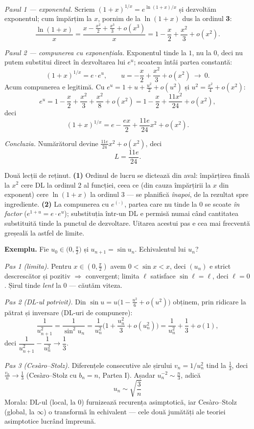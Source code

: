 \emph{Pasul 1 --- exponentul.} Scriem $(1+x)^{1/x}=e^{\ln(1+x)/x}$ și dezvoltăm exponentul; cum împărțim la $x$, pornim de la $\ln(1+x)$ dus la ordinul \textbf{3}:
\[
\frac{\ln(1+x)}{x}=\frac{x-\frac{x^2}{2}+\frac{x^3}{3}+o(x^3)}{x}
=1-\frac{x}{2}+\frac{x^2}{3}+o(x^2).
\]

\emph{Pasul 2 --- compunerea cu exponențiala.} Exponentul tinde la $1$, nu la $0$, deci nu putem substitui direct în dezvoltarea lui $e^u$; scoatem întâi partea constantă:
\[
(1+x)^{1/x}=e\cdot e^{u},
\qquad
u=-\frac{x}{2}+\frac{x^2}{3}+o(x^2)\ \to\ 0.
\]
Acum compunerea e legitimă. Cu $e^u=1+u+\frac{u^2}{2}+o(u^2)$ și $u^2=\frac{x^2}{4}+o(x^2)$:
\[
e^{u}=1-\frac{x}{2}+\frac{x^2}{3}+\frac{x^2}{8}+o(x^2)
=1-\frac{x}{2}+\frac{11x^2}{24}+o(x^2),
\]
deci
\[
(1+x)^{1/x}=e-\frac{ex}{2}+\frac{11e}{24}x^{2}+o(x^2).
\]

\emph{Concluzia.} Numărătorul devine $\frac{11e}{24}x^2+o(x^2)$, deci
\[
\boxed{\ L=\frac{11e}{24}.\ }
\]

Două lecții de reținut. \textbf{(1)} Ordinul de lucru se dictează din aval: împărțirea finală la $x^2$ cere DL la ordinul 2 al funcției, ceea ce (din cauza împărțirii la $x$ din exponent) cere $\ln(1+x)$ la ordinul 3 --- se planifică \emph{înapoi}, de la rezultat spre ingrediente. \textbf{(2)} La compunerea cu $e^{(\cdot)}$, partea care nu tinde la $0$ se scoate \emph{în factor} ($e^{1+u}=e\cdot e^u$); substituția într-un DL e permisă numai când cantitatea substituită tinde la punctul de dezvoltare. Uitarea acestui pas e cea mai frecventă greșeală la astfel de limite.

\medskip
\textbf{Exemplu.} Fie $u_0\in\big(0,\frac\pi2\big)$ și $u_{n+1}=\sin u_n$. Echivalentul lui $u_n$?

\emph{Pas 1 (limita).} Pentru $x\in(0,\frac\pi2)$ avem $0<\sin x<x$, deci $(u_n)$ e strict descrescător și pozitiv $\Rightarrow$ convergent; limita $\ell$ satisface $\sin\ell=\ell$, deci $\ell=0$. Șirul tinde \emph{lent} la $0$ --- căutăm viteza.

\emph{Pas 2 (DL-ul potrivit).} Din $\sin u=u\big(1-\frac{u^2}{6}+o(u^2)\big)$ obținem, prin ridicare la pătrat și inversare (DL-uri de compunere):
\[
\frac{1}{u_{n+1}^{2}}=\frac{1}{\sin^2u_n}=\frac{1}{u_n^2}\Big(1+\frac{u_n^2}{3}+o(u_n^2)\Big)
=\frac{1}{u_n^2}+\frac13+o(1),
\]
deci $\dfrac{1}{u_{n+1}^2}-\dfrac{1}{u_n^2}\to\dfrac13$.

\emph{Pas 3 (Cesàro--Stolz).} Diferențele consecutive ale șirului $v_n=1/u_n^2$ tind la $\frac13$, deci $\frac{v_n}{n}\to\frac13$ (Cesàro--Stolz cu $b_n=n$, Partea I). Așadar $u_n^{-2}\sim\frac n3$, adică
\[
\boxed{\;u_n\sim\sqrt{\frac{3}{n}}\;}
\]
Morala: DL-ul (local, la $0$) furnizează recurența asimptotică, iar Cesàro--Stolz (global, la $\infty$) o transformă în echivalent --- cele două jumătăți ale teoriei asimptotice lucrând împreună.

